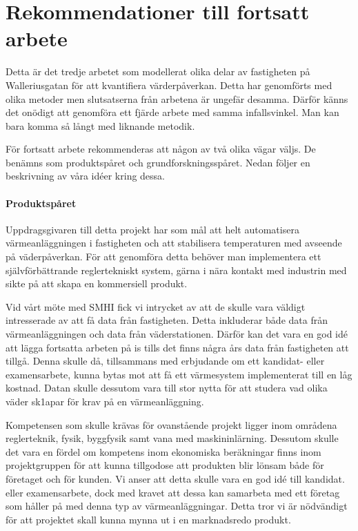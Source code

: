 \section{Rekommendationer till fortsatt arbete}

Detta är det tredje arbetet som modellerat olika delar av fastigheten på Walleriusgatan för att
kvantifiera värderpåverkan. Detta har genomförts med olika metoder men slutsatserna från arbetena är ungefär desamma.
Därför känns det onödigt att genomföra ett fjärde arbete med samma infallsvinkel. Man kan bara komma så
långt med liknande metodik.

För fortsatt arbete rekommenderas att någon av två olika vägar väljs. De benämns
som produktspåret och grundforskningsspåret. Nedan följer en beskrivning av våra idéer kring dessa.

\paragraph{Produktspåret}
Uppdragsgivaren till detta projekt har som mål att helt automatisera värmeanläggningen i fastigheten och att stabilisera
temperaturen med avseende på väderpåverkan. För att genomföra detta behöver man implementera ett självförbättrande
reglertekniskt system, gärna i nära kontakt med industrin med sikte på att skapa en kommersiell produkt. 

Vid vårt möte med SMHI fick vi intrycket av att de skulle vara väldigt intresserade av att få data från fastigheten.
Detta inkluderar både data från värmeanläggningen och data från väderstationen. Därför kan det vara
en god idé att lägga fortsatta arbeten på is tills det finns några års data från fastigheten att tillgå.
Denna skulle då, tillsammans med erbjudande om ett kandidat- eller examensarbete, kunna bytas mot att få ett värmesystem implementerat till en låg kostnad. Datan skulle dessutom vara till stor nytta för att studera vad olika väder sk1apar för
krav på en värmeanläggning. 

Kompetensen som skulle krävas för ovanstående projekt ligger inom områdena reglerteknik, fysik, byggfysik samt vana med maskininlärning.
Dessutom skulle det vara en fördel om kompetens inom ekonomiska beräkningar finns inom projektgruppen för att
kunna tillgodose att produkten blir lönsam både för företaget och för kunden. Vi anser att detta skulle vara en god
idé till kandidat. eller examensarbete, dock med kravet att dessa kan samarbeta med
ett företag som håller på med denna typ av värmeanläggningar. Detta tror vi är nödvändigt för att projektet skall kunna mynna ut i en marknadsredo produkt.


